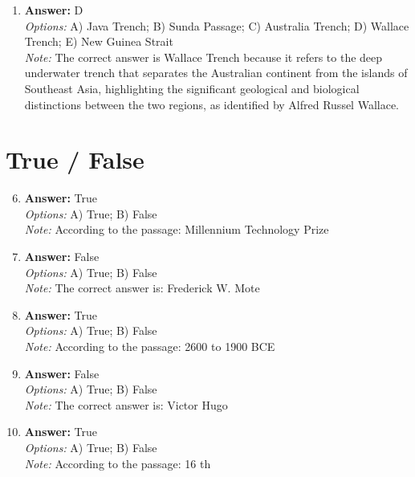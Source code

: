 \documentclass[12pt]{article}
\begin{document}
\begin{enumerate}[label=\arabic*.]
\\ \textit{Options:} A) steadily worsened.; B) was invented during this period.; C) evolved into a more sophisticated technology.; D) remained static without any changes.; E) changed only slightly.
\\ \textit{Note:} Hand axe technology remained relatively consistent during this period due to the stability of environmental conditions and the effectiveness of the tool for various tasks, leading to only minor modifications rather than significant advancements.
\item \textbf{Answer:} D
\\ \textit{Options:} A) Java Trench; B) Sunda Passage; C) Australia Trench; D) Wallace Trench; E) New Guinea Strait
\\ \textit{Note:} The correct answer is Wallace Trench because it refers to the deep underwater trench that separates the Australian continent from the islands of Southeast Asia, highlighting the significant geological and biological distinctions between the two regions, as identified by Alfred Russel Wallace.
\end{enumerate}

\section*{True / False}
\begin{enumerate}[label=\arabic*.]
\setcounter{enumi}{5}
\item \textbf{Answer:} True
\\ \textit{Options:} A) True; B) False
\\ \textit{Note:} According to the passage: Millennium Technology Prize
\item \textbf{Answer:} False
\\ \textit{Options:} A) True; B) False
\\ \textit{Note:} The correct answer is: Frederick W. Mote
\item \textbf{Answer:} True
\\ \textit{Options:} A) True; B) False
\\ \textit{Note:} According to the passage: 2600 to 1900 BCE
\item \textbf{Answer:} False
\\ \textit{Options:} A) True; B) False
\\ \textit{Note:} The correct answer is: Victor Hugo
\item \textbf{Answer:} True
\\ \textit{Options:} A) True; B) False
\\ \textit{Note:} According to the passage: 16 th
\end{enumerate}
\end{document}

